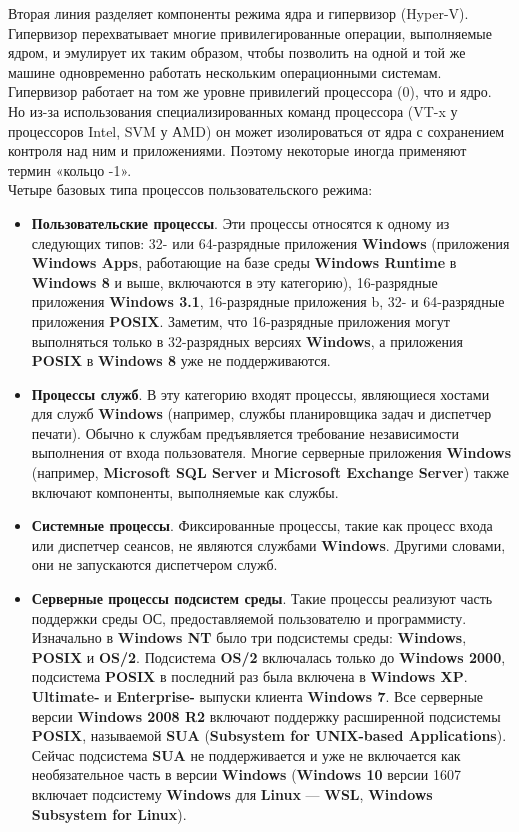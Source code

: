 \documentclass[14pt, a4paper]{article}
\begin{document}
Вторая линия разделяет компоненты режима ядра и гипервизор (Hyper-V). Гипервизор перехватывает
многие привилегированные операции, выполняемые ядром, и эмулирует их таким образом,
чтобы позволить на одной и той же машине одновременно работать нескольким операционными системам.
Гипервизор работает на том же уровне привилегий процессора (0), что и ядро. Но из-за
использования специализированных команд процессора (VT-x у процессоров Intel, SVM у АMD)
он может изолироваться от ядра с сохранением контроля над ним и приложениями.
Поэтому некоторые иногда применяют термин «кольцо -1». \\


Четыре базовых типа процессов пользовательского режима:
\begin{itemize}
    \item \textbf{Пользовательские процессы}. Эти процессы относятся к одному из следующих типов:
    32- или 64-разрядные приложения \textbf{Windows} (приложения \textbf{Windows Apps}, работающие на базе
    среды \textbf{Windows Runtime} в \textbf{Windows 8} и выше, включаются в эту категорию), 16-разрядные приложения \textbf{Windows 3.1},
    16-разрядные приложения b, 32- и 64-разрядные приложения \textbf{POSIX}. Заметим,
    что 16-разрядные приложения могут выполняться только в 32-разрядных версиях \textbf{Windows},
    а приложения \textbf{POSIX} в \textbf{Windows 8} уже не поддерживаются.

    \item \textbf{Процессы служб}. В эту категорию входят процессы, являющиеся хостами для
    служб \textbf{Windows} (например, службы планировщика задач и диспетчер печати).
    Обычно к службам предъявляется требование независимости выполнения от входа пользователя.
    Многие серверные приложения \textbf{Windows} (например, \textbf{Microsoft SQL Server} и \textbf{Microsoft Exchange Server})
    также включают компоненты, выполняемые как службы.

    \item \textbf{Системные процессы}. Фиксированные процессы, такие как процесс входа
    или диспетчер сеансов, не являются службами \textbf{Windows}. Другими словами,
    они не запускаются диспетчером служб.

    \item \textbf{Серверные процессы подсистем среды}. Такие процессы реализуют часть поддержки среды ОС,
    предоставляемой пользователю и программисту. Изначально в \textbf{Windows NT} было три подсистемы
    среды: \textbf{Windows}, \textbf{POSIX} и \textbf{OS/2}. Подсистема \textbf{OS/2} включалась только до \textbf{Windows 2000}, подсистема
    \textbf{POSIX} в последний раз была включена в \textbf{Windows XP}. \textbf{Ultimate-} и \textbf{Enterprise-} выпуски клиента
    \textbf{Windows 7}. Все серверные версии \textbf{Windows 2008 R2} включают поддержку расширенной подсистемы \textbf{POSIX},
    называемой \textbf{SUA} (\textbf{Subsystem for UNIX-based Applications}). Сейчас подсистема \textbf{SUA} не поддерживается
    и уже не включается как необязательное часть в версии \textbf{Windows} (\textbf{Windows 10} версии 1607 включает
    подсистему \textbf{Windows} для \textbf{Linux} — \textbf{WSL}, \textbf{Windows Subsystem for Linux}).
\end{itemize}
\end{document}
